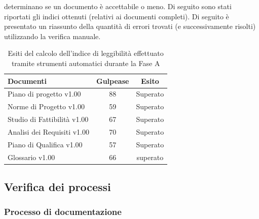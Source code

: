 				determinano se un documento è accettabile o meno. Di seguito sono stati riportati gli indici ottenuti (relativi ai documenti completi).
				Di seguito è presentato un riassunto della quantità di errori trovati (e successivamente risolti) utilizzando la verifica manuale.
				\begin{table}[H]
					\centering
					\begin{tabu}{| l | c | c |}
							\hline
							Documenti 							& Gulpease	& Esito		\\ \hline \hline
							
							Piano di progetto v1.00				& 88 		& Superato  \\ \hline
							Norme di Progetto v1.00 			& 59		& Superato  \\ \hline
							Studio di Fattibilità v1.00 		& 67		& Superato  \\ \hline
							Analisi dei Requisiti v1.00	 		& 70		& Superato  \\ \hline
							Piano di Qualifica v1.00 			& 57		& Superato  \\ \hline
							Glossario v1.00					 	& 66 		& superato  \\ \hline
						\end{tabu}
					\caption{Esiti del calcolo dell'indice di leggibilità effettuato tramite strumenti automatici durante la Fase A}
				\end{table}
	\subsection{Verifica dei processi}
		\subsubsection{Processo di documentazione}
